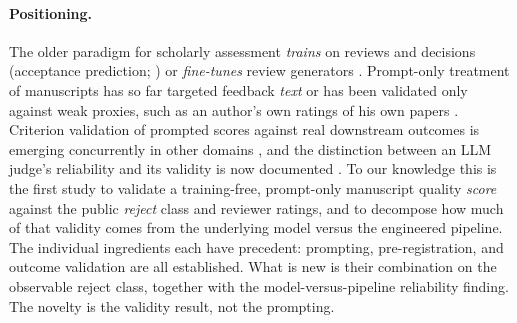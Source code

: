 \paragraph{Positioning.}
The older paradigm for scholarly assessment \emph{trains} on reviews and decisions
(acceptance prediction; \citealp{kang2018peerread}) or \emph{fine-tunes} review
generators \citep{idahl2025openreviewer}. Prompt-only treatment of manuscripts has so
far targeted feedback \emph{text} \citep{liang2024llm} or has been validated only against
weak proxies, such as an author's own ratings of his own papers
\citep{thelwall2024chatgpt}. Criterion validation of prompted scores against real downstream
outcomes is emerging concurrently in other domains \citep{chen2026criterion}, and the
distinction between an LLM judge's reliability and its validity is now documented
\citep{norman2026reliability}. To our knowledge this is the first study to validate a
training-free, prompt-only manuscript quality \emph{score} against the public \emph{reject}
class and reviewer ratings, and to decompose how much of that validity comes from the
underlying model versus the engineered pipeline. The individual ingredients each have
precedent: prompting, pre-registration, and outcome validation are all established. What
is new is their combination on the observable reject class, together with the
model-versus-pipeline reliability finding. The novelty is the validity result, not the
prompting.
\fi
